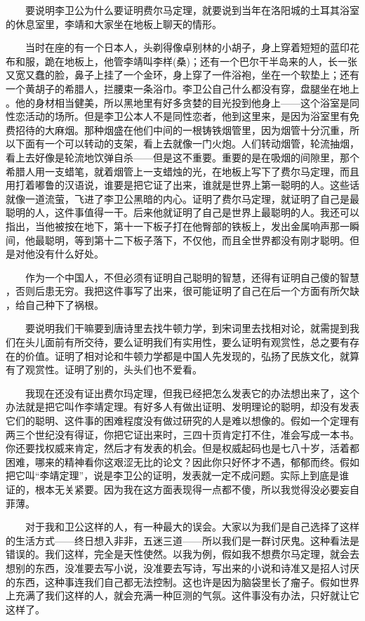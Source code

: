  　　要说明李卫公为什么要证明费尔马定理，就要说到当年在洛阳城的土耳其浴室 的休息室里，李靖和大家坐在地板上聊天的情形。

 　　当时在座的有一个日本人，头剃得像卓别林的小胡子，身上穿着短短的蓝印花 布和服，跪在地板上，他管李靖叫李样(桑)；还有一个巴尔干半岛来的人，长一张 又宽又蠢的脸，鼻子上挂了一个金环，身上穿了一件浴袍，坐在一个软垫上；还有 一个黄胡子的希腊人，拦腰束一条浴巾。李卫公自己什么都没有穿，盘腿坐在地上 。他的身材相当健美，所以黑地里有好多贪婪的目光投到他身上——这个浴室是同 性恋活动的场所。但是李卫公本人不是同性恋者，他到这里来，是因为浴室里有免 费招待的大麻烟。那种烟盛在他们中间的一根铸铁烟管里，因为烟管十分沉重，所 以下面有一个可以转动的支架，看上去就像一门火炮。人们转动烟管，轮流抽烟， 看上去好像是轮流地饮弹自杀——但是这不重要。重要的是在吸烟的间隙里，那个 希腊人用一支蜡笔，就着烟管上一支蜡烛的光，在地板上写下了费尔马定理，而且 用打着嘟鲁的汉语说，谁要是把它证了出来，谁就是世界上第一聪明的人。这些话 就像一道流萤，飞进了李卫公黑暗的内心。证明了费尔马定理，就证明了自己是最 聪明的人，这件事值得一干。后来他就证明了自己是世界上最聪明的人。我还可以 指出，当他被按在地下，第十一下板子打在他臀部的铁板上，发出金属响声那一瞬 间，他最聪明，等到第十二下板子落下，不仅他，而且全世界都没有刚才聪明。但 是对他没有什么好处。

 　　作为一个中国人，不但必须有证明自己聪明的智慧，还得有证明自己傻的智慧 ，否则后患无穷。我把这件事写了出来，很可能证明了自己在后一个方面有所欠缺 ，给自己种下了祸根。

 　　要说明我们干嘛要到唐诗里去找牛顿力学，到宋词里去找相对论，就需提到我 们在头儿面前有所交待，要么证明我们有实用性，要么证明有观赏性，总之要有存 在的价值。证明了相对论和牛顿力学都是中国人先发现的，弘扬了民族文化，就算 有了观赏性。证明了别的，头头们也不爱看。

 　　我现在还没有证出费尔玛定理，但我已经把怎么发表它的办法想出来了，这个 办法就是把它叫作李靖定理。有好多人有做出证明、发明理论的聪明，却没有发表 它们的聪明、这件事的困难程度没有做过研究的人是难以想像的。假如一个定理有 两三个世纪没有得证，你把它证出来时，三四十页肯定打不住，准会写成一本书。 你还要找权威来肯定，然后才有发表的机会。但是权威起码也是七八十岁，活着都 困难，哪来的精神看你这艰涩无比的论文？因此你只好怀才不遇，郁郁而终。假如 把它叫“李靖定理”，说是李卫公的证明，发表就一定不成问题。实际上到底是谁 证的，根本无关紧要。因为我在这方面表现得一点都不傻，所以我觉得没必要妄自 菲薄。

 　　对于我和卫公这样的人，有一种最大的误会。大家以为我们是自己选择了这样 的生活方式——终日想入非非，五迷三道——所以我们是一群讨厌鬼。这种看法是 错误的。我们这样，完全是天性使然。以我为例，假如我不想费尔马定理，就会去 想别的东西，没准要去写小说，没准要去写诗，写出来的小说和诗准又是招人讨厌 的东西，这种事连我们自己都无法控制。这也许是因为脑袋里长了瘤子。假如世界 上充满了我们这样的人，就会充满一种叵测的气氛。这件事没有办法，只好就让它 这样了。 

